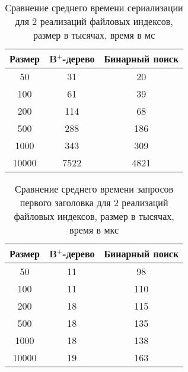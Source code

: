 \begin{table}[!h]
    \begin{center}
        \begin{tabular}{|c|c|c|}
            \hline
            Размер & B$^+$-дерево & Бинарный поиск \\
            \hline
            50 & 31 & 20\\
            \hline
            100 & 61 & 39\\
            \hline
            200 & 114 & 68\\
            \hline
            500 & 288 & 186\\
            \hline
            1000 & 343 & 309\\
            \hline
            10000 & 7522 & 4821\\
            \hline
        \end{tabular}
    \end{center}
    \caption{\label{tab:serialization} Сравнение среднего времени сериализации для 2 реализаций файловых индексов, размер в тысячах, время в мс}
\end{table}


\clearpage

\begin{table}[!h]
    \begin{center}
        \begin{tabular}{|c|c|c|}
            \hline
            Размер & B$^+$-дерево & Бинарный поиск \\
            \hline
            50 & 11 & 98\\
            \hline
            100 & 11 & 110\\
            \hline
            200 & 18 & 115\\
            \hline
            500 & 18 & 135\\
            \hline
            1000 & 18 & 138\\
            \hline
            10000 & 19 & 163\\
            \hline
        \end{tabular}
    \end{center}
    \caption{\label{tab:any} Сравнение среднего времени запросов первого заголовка для 2 реализаций файловых индексов, размер в тысячах, время в мкс}
\end{table}


